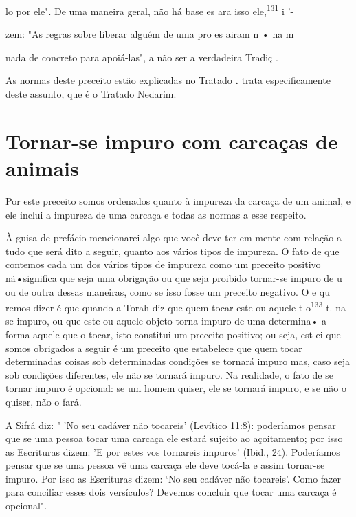 lo por ele". De uma maneira geral, não há base es ara isso
ele,\textsuperscript{131} i '-

zem: "As regras sobre liberar alguém de uma pro es airam n • na m

nada de concreto para apoiá-las", a não ser a verdadeira Tradiç .

As normas deste preceito estão explicadas no Tratado
\textbf{.} trata es­pecificamente deste assunto, que é
o Tratado Nedarim.

\section{Tornar-se impuro com carcaças de animais}

Por este preceito somos ordenados quanto à impureza da carcaça de um
animal, e ele inclui a impureza de uma carcaça e todas as normas a esse
respeito.

À guisa de prefácio mencionarei algo que você deve ter em mente com
relação a tudo que será dito a seguir, quanto aos vários tipos de
impureza. O fato de que contemos cada um dos vários tipos de impureza
como um pre­ceito positivo nã•significa que seja uma obrigação ou que
seja proibido tornar-se impuro de u ou de outra dessas maneiras, como se
isso fosse um preceito negativo. O e qu remos dizer é que quando a Torah
diz que quem tocar este ou aquele t o\textsuperscript{133} t. na-se
impuro, ou que este ou aquele objeto torna impuro de uma determina• a
forma aquele que o tocar, isto constitui um preceito posi­tivo; ou seja,
est ei que somos obrigados a seguir é um preceito que estabele­ce que
quem tocar determinadas coisas sob determinadas condições se tornará
impuro mas, caso seja sob condições diferentes, ele não se tornará
impuro. Na realidade, o fato de se tornar impuro é opcional: se um homem
quiser, ele se tornará impuro, e se não o quiser, não o fará.

A Sifrá diz: " 'No seu cadáver não tocareis' (Levítico 11:8):
podería­mos pensar que se uma pessoa tocar uma carcaça ele estará
sujeito ao açoita­mento; por isso as Escrituras dizem: 'E por estes vos
tornareis impuros' (Ibid., 24). Poderíamos pensar que se uma pessoa vê
uma carcaça ele deve tocá-la e assim tornar-se impuro. Por isso as
Escrituras dizem: `No seu cadáver não toca­reis'. Como fazer para
conciliar esses dois versículos? Devemos concluir que tocar uma carcaça
é opcional".


